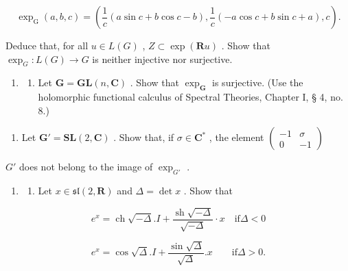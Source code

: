 \[
\exp_ {\mathrm{G}} (a, b, c) = \left(\frac {1}{c} (a \sin c + b \cos c - b), \frac {1}{c} (- a \cos c + b \sin c + a), c\right).
\]

Deduce that, for all \(u \in L(G)\) , \(Z \subset \exp(\mathbf{R}u)\) . Show that \(\exp_G: L(G) \to G\) is neither injective nor surjective.

\begin{enumerate}
\def\labelenumi{\arabic{enumi}.}
\setcounter{enumi}{13}
\tightlist
\item
  \begin{enumerate}
  \def\labelenumii{(\alph{enumii})}
  \tightlist
  \item
    Let \(\mathbf{G} = \mathbf{GL}(n, \mathbf{C})\) . Show that \(\exp_{\mathbf{G}}\) is surjective. (Use the holomorphic functional calculus of Spectral Theories, Chapter I, § 4, no. 8.)
  \end{enumerate}
\end{enumerate}

\begin{enumerate}
\def\labelenumi{(\alph{enumi})}
\setcounter{enumi}{1}
\tightlist
\item
  Let \(\mathbf{G}' = \mathbf{SL}(2, \mathbf{C})\) . Show that, if \(\sigma \in \mathbf{C}^*\) , the element \(\left( \begin{array}{cc} -1 & \sigma \\ 0 & -1 \end{array} \right)\)
\end{enumerate}

\(G'\) does not belong to the image of \(\exp_{G'}\) .

\begin{enumerate}
\def\labelenumi{\arabic{enumi}.}
\setcounter{enumi}{14}
\tightlist
\item
  \begin{enumerate}
  \def\labelenumii{(\alph{enumii})}
  \tightlist
  \item
    Let \(x \in \mathfrak{sl}(2, \mathbf{R})\) and \(\Delta = \det x\) . Show that
  \end{enumerate}
\end{enumerate}

\[
e ^ {x} = \operatorname{ch} \sqrt {- \Delta}. I + \frac {\operatorname{sh} \sqrt {- \Delta}}{\sqrt {- \Delta}} \cdot x \quad \mathrm{if} \Delta <   0
\]

\[
e ^ {x} = \cos {\sqrt {\Delta}}. I + \frac {\sin {\sqrt {\Delta}}}{\sqrt {\Delta}}. x \qquad \mathrm{if} \Delta > 0.
\]


